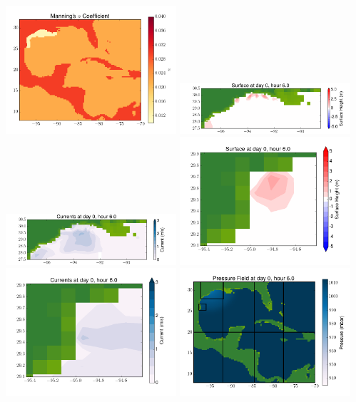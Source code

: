 \documentclass[11pt]{article}
\begin{document}
\vskip 10pt 
\includegraphics[width=0.475\textwidth]{frame0013fig3.png}
\includegraphics[width=0.475\textwidth]{frame0013fig4.png}
\vskip 10pt 
\includegraphics[width=0.475\textwidth]{frame0013fig5.png}
\includegraphics[width=0.475\textwidth]{frame0013fig6.png}
\vskip 10pt 
\includegraphics[width=0.475\textwidth]{frame0013fig7.png}
\includegraphics[width=0.475\textwidth]{frame0013fig8.png}
\end{document}
